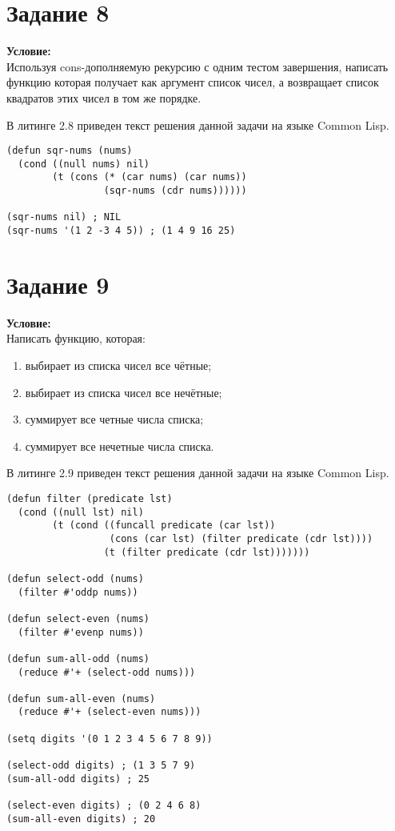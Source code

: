 \section{Задание \No{}8}
\textbf{Условие:}\\Используя cons-дополняемую рекурсию с одним тестом завершения, написать функцию которая получает как аргумент список чисел, а возвращает список квадратов этих чисел в том же порядке.

В литинге 2.8 приведен текст решения данной задачи на языке Common Lisp.

\begin{lstlisting}[caption={Задание \No{}8}]
(defun sqr-nums (nums)
  (cond ((null nums) nil)
        (t (cons (* (car nums) (car nums))
                 (sqr-nums (cdr nums))))))

(sqr-nums nil) ; NIL
(sqr-nums '(1 2 -3 4 5)) ; (1 4 9 16 25)
\end{lstlisting}

\section{Задание \No{}9}
\textbf{Условие:}\\Написать функцию, которая:
\begin{enumerate}
    \item выбирает из списка чисел все чётные;
    \item выбирает из списка чисел все нечётные;
    \item суммирует все четные числа списка;
    \item суммирует все нечетные числа списка.
\end{enumerate}

В литинге 2.9 приведен текст решения данной задачи на языке Common Lisp.

\begin{lstlisting}[caption={Задание \No{}9}]
(defun filter (predicate lst)
  (cond ((null lst) nil)
        (t (cond ((funcall predicate (car lst))
                  (cons (car lst) (filter predicate (cdr lst))))
                 (t (filter predicate (cdr lst)))))))

(defun select-odd (nums)
  (filter #'oddp nums))

(defun select-even (nums)
  (filter #'evenp nums))

(defun sum-all-odd (nums)
  (reduce #'+ (select-odd nums)))

(defun sum-all-even (nums)
  (reduce #'+ (select-even nums)))

(setq digits '(0 1 2 3 4 5 6 7 8 9))

(select-odd digits) ; (1 3 5 7 9)
(sum-all-odd digits) ; 25

(select-even digits) ; (0 2 4 6 8)
(sum-all-even digits) ; 20
\end{lstlisting}

